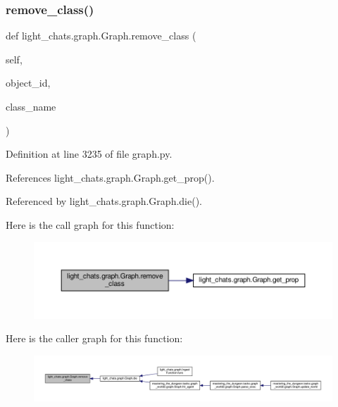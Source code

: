 \subsubsection{\texorpdfstring{remove\+\_\+class()}{remove\_class()}}
{\footnotesize\ttfamily def light\+\_\+chats.\+graph.\+Graph.\+remove\+\_\+class (\begin{DoxyParamCaption}\item[{}]{self,  }\item[{}]{object\+\_\+id,  }\item[{}]{class\+\_\+name }\end{DoxyParamCaption})}



Definition at line 3235 of file graph.\+py.



References light\+\_\+chats.\+graph.\+Graph.\+get\+\_\+prop().



Referenced by light\+\_\+chats.\+graph.\+Graph.\+die().

Here is the call graph for this function\+:
\nopagebreak
\begin{figure}[H]
\begin{center}
\leavevmode
\includegraphics[width=350pt]{classlight__chats_1_1graph_1_1Graph_ab799f6160a4e8dd1550b2e245cdd2d53_cgraph}
\end{center}
\end{figure}
Here is the caller graph for this function\+:
\nopagebreak
\begin{figure}[H]
\begin{center}
\leavevmode
\includegraphics[width=350pt]{classlight__chats_1_1graph_1_1Graph_ab799f6160a4e8dd1550b2e245cdd2d53_icgraph}
\end{center}
\end{figure}
\mbox{\label{classlight__chats_1_1graph_1_1Graph_a90e0b9f3f4a4acc29c49cc730aad1539}} 
